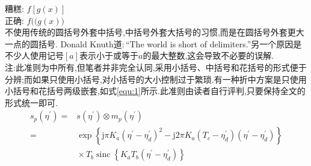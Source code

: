 \documentclass[a4paper]{article}
\newcommand{\deqref}[1]{\CJKecglue\eqref{#1}\CJKecglue}
\newcommand{\dcite}[1]{\CJKecglue\cite{#1}\CJKecglue}
\begin{document}
\begin{compactitem}[\hspace{1.02em}$\bullet$]
	\textsf{糟糕}: $f[g(x)]$\\
	\textsf{正确}: $f\bigl((g(x)\bigr)$\\
	不使用传统的圆括号外套中括号,中括号外套大括号的习惯,而是在圆括号外套更大一点的圆括号. Donald Knuth道:\,``The world is short of delimiters.''另一个原因是不少人使用记号$[a]$表示小于或等于$a$的最大整数,这会导致不必要的误解.\\
	\textsf{注}:此准则为\dcite{1}中所有,但笔者并非完全认同,采用小括号、中括号和花括号的形式便于分辨;而如果只使用小括号,对小括号的大小控制过于繁琐.有一种折中方案是只使用小括号和花括号两级嵌套,如式\deqref{equ:1}所示.此准则由读者自行评判,只要保持全文的形式统一即可.\eop
	\begin{equation}\label{equ:1}
		\begin{aligned}
			s_{p}\left(\eta^{\prime}\right)={}& s\left(\eta^{\prime}\right) \otimes m_{p}\left(\eta^{\prime}\right) \\
			={}& \exp \left\{\mathrm{j} \pi K_{a}\left(\eta^{\prime}-\eta_{d}^{\prime}\right)^{2}-\mathrm{j} 2 \pi K_{a}\left(T_{c}-\eta_{d}^{\prime}\right)\left(\eta^{\prime}-\eta_{d}^{\prime}\right)\right\} \\
			& {}\times T_{b} \operatorname{sinc}\left\{K_{a} T_{b}\left(\eta^{\prime}-\eta_{d}^{\prime}\right)\right\}
			\end{aligned}
	\end{equation}
\end{compactitem}
\end{document}
